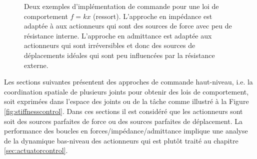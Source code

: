 \begin{figure}[H]
				\vspace{-10pt}
        \centering
				\hspace{5pt}
        \caption{Deux exemples d'implémentation de commande pour une loi de comportement $f=kx$ (ressort). L'approche en impédance est adaptée à aux actionneurs qui sont des sources de force avec peu de résistance interne. L'approche en admittance est adaptée aux actionneurs qui sont irréversibles et donc des sources de déplacements idéales qui sont peu influencées par la résistance externe.}
				\label{fig:impedanceadmitancesex}
\end{figure}

Les sections suivantes présentent des approches de commande haut-niveau, i.e. la coordination spatiale de plusieurs joints pour obtenir des lois de comportement, soit exprimées dans l'espace des joints ou de la tâche comme illustré à la Figure \ref{fig:stiffnesscontrol}. Dans ces sections il est considéré que les actionneurs sont soit des sources parfaites de force ou des sources parfaites de déplacement. La performance des boucles en forces/impédance/admittance implique une analyse de la dynamique bas-niveau des actionneurs qui est plutôt traité au chapitre \ref{sec:actuatorcontrol}. 


